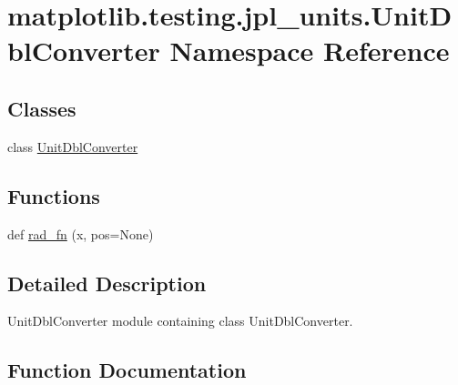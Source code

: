 \hypertarget{namespacematplotlib_1_1testing_1_1jpl__units_1_1UnitDblConverter}{}\section{matplotlib.\+testing.\+jpl\+\_\+units.\+Unit\+Dbl\+Converter Namespace Reference}
\label{namespacematplotlib_1_1testing_1_1jpl__units_1_1UnitDblConverter}
\subsection*{Classes}
\begin{DoxyCompactItemize}
\item 
class \hyperlink{classmatplotlib_1_1testing_1_1jpl__units_1_1UnitDblConverter_1_1UnitDblConverter}{Unit\+Dbl\+Converter}
\end{DoxyCompactItemize}
\subsection*{Functions}
\begin{DoxyCompactItemize}
\item 
def \hyperlink{namespacematplotlib_1_1testing_1_1jpl__units_1_1UnitDblConverter_afe7823057c45aea7c1ff3998606603e9}{rad\+\_\+fn} (x, pos=None)
\end{DoxyCompactItemize}


\subsection{Detailed Description}
\begin{DoxyVerb}UnitDblConverter module containing class UnitDblConverter.\end{DoxyVerb}
 

\subsection{Function Documentation}
\mbox{\label{namespacematplotlib_1_1testing_1_1jpl__units_1_1UnitDblConverter_afe7823057c45aea7c1ff3998606603e9}} 
